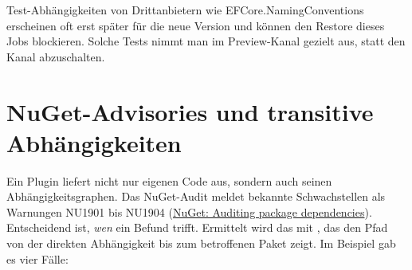 
Test-Abhängigkeiten von Drittanbietern wie EFCore.NamingConventions erscheinen oft erst
später für die neue Version und können den Restore dieses Jobs blockieren. Solche Tests
nimmt man im Preview-Kanal gezielt aus, statt den Kanal abzuschalten.

\section{NuGet-Advisories und transitive Abhängigkeiten}\label{sec:nuget-advisories}

Ein Plugin liefert nicht nur eigenen Code aus, sondern auch seinen Abhängigkeitsgraphen. Das
NuGet-Audit meldet bekannte Schwachstellen als Warnungen NU1901 bis NU1904
(\href{https://learn.microsoft.com/en-us/nuget/concepts/auditing-packages}{NuGet: Auditing package dependencies}).
Entscheidend ist, \emph{wen} ein Befund trifft. Ermittelt wird das mit ,
das den Pfad von der direkten Abhängigkeit bis zum betroffenen Paket zeigt. Im Beispiel gab es
vier Fälle:

